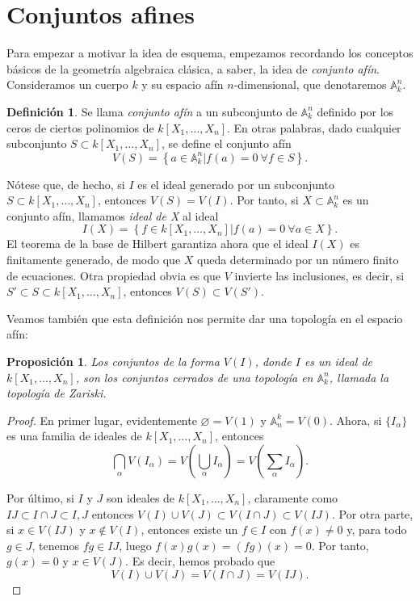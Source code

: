 \documentclass[12pt,a4paper]{article}
\newtheorem{prop}[thm]{Proposición}
\theoremstyle{definition} \newtheorem{defn}[thm]{Definición}
\theoremstyle{definition} \newtheorem{ejemplo}[thm]{Ejemplo}
\theoremstyle{definition} \newtheorem{ejercicio}[thm]{Ejercicio}
\theoremstyle{remark} \newtheorem*{obs}{Observación}
\def\AA{\mathbb{A}}
\begin{document}
\section{Conjuntos afines}
Para empezar a motivar la idea de esquema, empezamos recordando los conceptos básicos de la geometría algebraica clásica, a saber, la idea de \emph{conjunto afín}. Consideramos un cuerpo $k$ y su espacio afín $n$-dimensional, que denotaremos $\AA_k^n$.
\begin{defn}
  Se llama \emph{conjunto afín} a un subconjunto de $\AA_k^n$ definido por los ceros de ciertos polinomios de $k[X_1,\dots,X_n]$. En otras palabras, dado cualquier subconjunto $S\subset k[X_1,\dots,X_n]$, se define el conjunto afín
  \begin{equation*}
    V(S)=\left\{ a\in \AA_k^n \vert f(a)=0 \ \forall f\in S \right\}.
  \end{equation*}
\end{defn}

Nótese que, de hecho, si $I$ es el ideal generado por un subconjunto $S\subset k[X_1,\dots,X_n]$, entonces $V(S)=V(I)$. Por tanto, si $X\subset \AA_k^n$ es un conjunto afín, llamamos \emph{ideal de X} al ideal
\begin{equation*}
  I(X)=\left\{ f\in k[X_1,\dots,X_n] | f(a)=0 \ \forall a \in X \right\}.
\end{equation*}
El teorema de la base de Hilbert garantiza ahora que el ideal $I(X)$ es finitamente generado, de modo que $X$ queda determinado por un número finito de ecuaciones. Otra propiedad obvia es que $V$ invierte las inclusiones, es decir, si $S' \subset S\subset k[X_1,\dots,X_n]$, entonces $V(S)\subset V(S')$. 

Veamos también que esta definición nos permite dar una topología en el espacio afín:
\begin{prop}
  Los conjuntos de la forma $V(I)$, donde $I$ es un ideal de $k[X_1,\dots,X_n]$, son los conjuntos cerrados de una topología en $\AA_k^n$, llamada la \emph{topología de Zariski}.
\end{prop}

\begin{proof}
  En primer lugar, evidentemente $\varnothing=V(1)$ y $\AA^k_n=V(0)$. Ahora, si $\{I_{\alpha}\}$ es una familia de ideales de $k[X_1,\dots,X_n]$, entonces 
  \begin{equation*}
    \bigcap_{\alpha} V(I_{\alpha})=V\left( \bigcup_{\alpha}I_{\alpha} \right)=V\left( \sum_{\alpha}I_{\alpha} \right).
  \end{equation*}

  Por último, si $I$ y $J$ son ideales de $k[X_1,\dots,X_n]$, claramente como $IJ\subset I\cap J \subset I, J$ entonces $V(I)\cup V(J) \subset V(I\cap J) \subset V(IJ)$. Por otra parte, si $x\in V(IJ)$ y $x \not\in V(I)$, entonces existe un $f\in I$ con $f(x)\neq 0$ y, para todo $g\in J$, tenemos $fg\in IJ$, luego $f(x)g(x)=(fg)(x)=0$. Por tanto, $g(x)=0$ y $x\in V(J)$. Es decir, hemos probado que 
\begin{equation*}
  V(I)\cup V(J)=V(I\cap J)=V(IJ).
  \end{equation*}
\end{proof}
\end{document}
